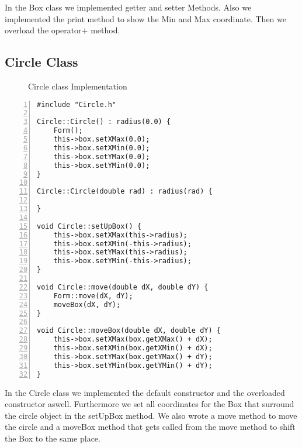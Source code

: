 \documentclass{article}
\begin{document}
\normalsize{In the Box class we implemented getter and setter Methods. Also we implemented the print method to show the Min and Max coordinate. Then we overload the  operator$+$ method.\newline
}\newpage
\subsection{Circle Class}
\begin{figure}
\scriptsize{\caption{Circle class Implementation}}
\end{figure}
\begin{lstlisting}[basicstyle=\footnotesize\ttfamily, numbers=left, stepnumber=1, numberstyle = \normalsize]
#include "Circle.h"

Circle::Circle() : radius(0.0) {
	Form();
	this->box.setXMax(0.0);
	this->box.setXMin(0.0);
	this->box.setYMax(0.0);
	this->box.setYMin(0.0);
}

Circle::Circle(double rad) : radius(rad) {

}

void Circle::setUpBox() {
	this->box.setXMax(this->radius);
	this->box.setXMin(-this->radius);
	this->box.setYMax(this->radius);
	this->box.setYMin(-this->radius);
}

void Circle::move(double dX, double dY) {
	Form::move(dX, dY);
	moveBox(dX, dY);
}

void Circle::moveBox(double dX, double dY) {
	this->box.setXMax(box.getXMax() + dX);
	this->box.setXMin(box.getXMin() + dX);
	this->box.setYMax(box.getYMax() + dY);
	this->box.setYMin(box.getYMin() + dY);
}

\end{lstlisting}
\normalsize{In the Circle class we implemented the default constructor and the overloaded constructor aswell. Furthermore we set all coordinates for the Box that surround the circle object in the setUpBox method. We also wrote a move method to move the circle and a moveBox method that gets called from the move method to shift the Box to the same place.\newline
}
\newpage
\end{document}
